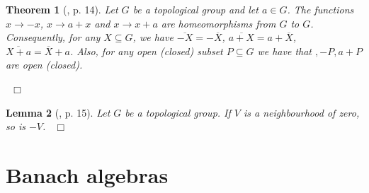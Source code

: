 \documentclass[12pt, oneside]{book}
\newtheorem{theorem}{Theorem}[subsection]
\newtheorem{lemma}[theorem]{Lemma}
\newcommand{\qed}{\hfill ~$\Box$\\}
\begin{document}
\begin{theorem}[\cite{W1}, p. 14] \label{thmTranslationThm}
\normalfont
\noindent Let $G$ be a topological group and let $a \in G$. The functions 
$x \rightarrow -x$, $x \rightarrow a + x$ and $x \rightarrow x + a$ are homeomorphisms from $G$ to $G$. 
Consequently, for any $X \subseteq G$, we have 
$\overline{-X} = - \overline{X}$, 
$\overline{a + X} =  a + \overline{X}$, $\overline{X + a} = \overline{X} + a$. Also, for any open 
(closed) subset $P \subseteq G$ we have that $, -P, a + P$ are open (closed).

\qed
\end{theorem}
\vspace{-1cm}
\begin{lemma}[\cite{W1}, p. 15]  \label{MinVANbhood}
\normalfont
\noindent Let $G$ be a topological group. If $V$ is a neighbourhood of zero, so is $-V$. \qed

\end{lemma}




\vspace{-1cm}

\section{Banach algebras}
\end{document}
